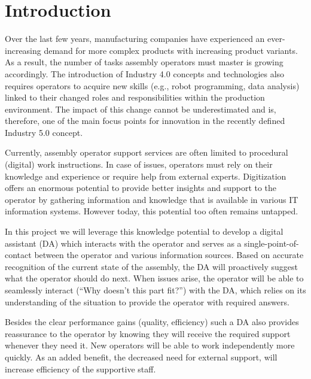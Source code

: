 \section{Introduction}\label{sec:Introduction}

Over the last few years, manufacturing companies have experienced an ever-increasing demand for more complex products with increasing product variants. As a result, the number of tasks assembly operators must master is growing accordingly. The introduction of Industry 4.0 concepts and technologies also requires operators to acquire new skills (e.g., robot programming, data analysis) linked to their changed roles and responsibilities within the production environment. The impact of this change cannot be underestimated and is, therefore, one of the main focus points for innovation in the recently defined Industry 5.0 concept. 

Currently, assembly operator support services are often limited to procedural (digital) work instructions. In case of issues, operators must rely on their knowledge and experience or require help from external experts. Digitization offers an enormous potential to provide better insights and support to the operator by gathering information and knowledge that is available in various IT information systems. However today, this potential too often remains untapped. 

In this project we will leverage this knowledge potential to develop a digital assistant (DA) which interacts with the operator and serves as a single-point-of-contact between the operator and various information sources. Based on accurate recognition of the current state of the assembly, the DA will proactively suggest what the operator should do next. When issues arise, the operator will be able to seamlessly interact (“Why doesn’t this part fit?”) with the DA, which relies on its understanding of the situation to provide the operator with required answers. 

Besides the clear performance gains (quality, efficiency) such a DA also provides reassurance to the operator by knowing they will receive the required support whenever they need it. New operators will be able to work independently more quickly. As an added benefit, the decreased need for external support, will increase efficiency of the supportive staff.
